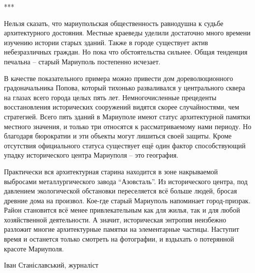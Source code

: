 







***

Нельзя сказать, что мариупольская общественность равнодушна к судьбе
архитектурного достояния. Местные краеведы уделили достаточно много времени
изучению истории старых зданий. Также в городе существует актив небезразличных
граждан. Но пока что обстоятельства сильнее. Общая тенденция печальна – старый
Мариуполь постепенно исчезает.

В качестве показательного примера можно привести дом дореволюционного
градоначальника Попова, который тихонько разваливался у центрального сквера на
глазах всего города целых пять лет. Немногочисленные прецеденты восстановления
исторических сооружений видятся скорее случайностями, чем стратегией. Всего
пять зданий в Мариуполе имеют статус архитектурной памятки местного значения, и
только три относятся к рассматриваемому нами периоду. Но благодаря бюрократии и
эти объекты могут лишиться своей защиты. Кроме отсутствия официального статуса
существует ещё один фактор способствующий упадку исторического центра Мариуполя
– это география.

Практически вся архитектурная старина находится в зоне накрываемой выбросами
металлургического завода \enquote{Азовсталь}. Из исторического центра, под давлением
экологической обстановки переселяется всё больше людей, бросая древние дома на
произвол. Кое-где старый Мариуполь напоминает город-призрак. Район становится
всё менее привлекательным как для жилья, так и для любой хозяйственной
деятельности. А значит, историческая энтропия неизбежно разложит многие
архитектурные памятки на элементарные частицы. Наступит время и останется
только смотреть на фотографии, и вздыхать о потерянной красоте Мариуполя.

Іван Станіславський, журналіст

\fi

